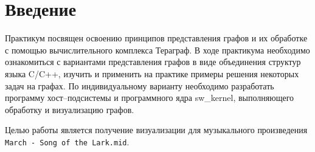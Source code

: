 \chapter{Введение}

Практикум посвящен освоению принципов представления графов и их обработке с помощью вычислительного комплекса Тераграф.
В ходе практикума необходимо ознакомиться с вариантами представления графов в виде объединения структур языка C/C++, изучить и применить на практике примеры решения некоторых задач на графах.
По индивидуальному варианту необходимо разработать программу хост--подсистемы и программного ядра sw\_kernel, выполняющего обработку и визуализацию графов.

Целью работы является получение визуализации для музыкального произведения \texttt{March - Song of the Lark.mid}.